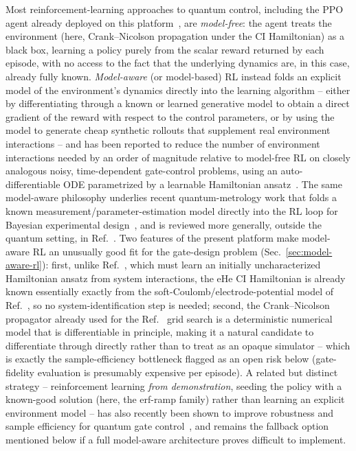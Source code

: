 \documentclass[aps,prapplied,reprint,superscriptaddress,longbibliography]{revtex4-2}
\begin{document}
Most reinforcement-learning approaches to quantum control, including the PPO agent already deployed
on this platform~\cite{schulman2017proximal,perruzza2026}, are \emph{model-free}: the agent treats
the environment (here, Crank--Nicolson propagation under the CI Hamiltonian) as a black box, learning
a policy purely from the scalar reward returned by each episode, with no access to the fact that the
underlying dynamics are, in this case, already fully known. \emph{Model-aware} (or model-based) RL
instead folds an explicit model of the environment's dynamics directly into the learning algorithm --
either by differentiating through a known or learned generative model to obtain a direct gradient of
the reward with respect to the control parameters, or by using the model to generate cheap synthetic
rollouts that supplement real environment interactions -- and has been reported to reduce the number
of environment interactions needed by an order of magnitude relative to model-free RL on closely
analogous noisy, time-dependent gate-control problems, using an auto-differentiable ODE parametrized
by a learnable Hamiltonian ansatz~\cite{khalid2023samplemodelbased}. The same model-aware philosophy
underlies recent quantum-metrology work that folds a known measurement/parameter-estimation model
directly into the RL loop for Bayesian experimental design~\cite{belliardo2024model}, and is reviewed
more generally, outside the quantum setting, in Ref.~\cite{moerland2023modelbased}. Two features of
the present platform make model-aware RL an unusually good fit for the gate-design problem
(Sec.~\ref{sec:model-aware-rl}): first, unlike Ref.~\cite{khalid2023samplemodelbased}, which must
learn an initially uncharacterized Hamiltonian ansatz from system interactions, the eHe CI Hamiltonian
is already known essentially exactly from the soft-Coulomb/electrode-potential model of
Ref.~\cite{beysengulov2024}, so no system-identification step is needed; second, the Crank--Nicolson
propagator already used for the Ref.~\cite{leinonen2025} grid search is a deterministic numerical
model that is differentiable in principle, making it a natural candidate to differentiate through
directly rather than to treat as an opaque simulator -- which is exactly the sample-efficiency
bottleneck flagged as an open risk below (gate-fidelity evaluation is presumably expensive per
episode). A related but distinct strategy -- reinforcement learning \emph{from demonstration},
seeding the policy with a known-good solution (here, the erf-ramp family) rather than learning an
explicit environment model -- has also recently been shown to improve robustness and sample
efficiency for quantum gate control~\cite{li2025robust}, and remains the fallback option mentioned
below if a full model-aware architecture proves difficult to implement.
\end{document}
